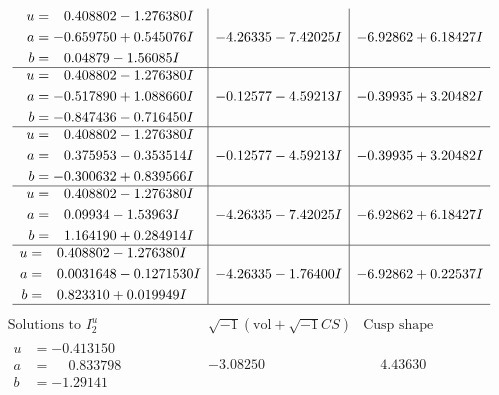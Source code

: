 \documentclass[1p]{elsarticle_modified}
\theoremstyle{definition}
\newcommand{\I}{\sqrt{-1}}
\begin{document}
$$\begin{array}{c|c|c}
\begin{aligned}
u &= \phantom{-}0.408802 - 1.276380 I \\
a &= -0.659750 + 0.545076 I \\
b &= \phantom{-}0.04879 - 1.56085 I\end{aligned}
 & -4.26335 - 7.42025 I & -6.92862 + 6.18427 I \\ \hline\begin{aligned}
u &= \phantom{-}0.408802 - 1.276380 I \\
a &= -0.517890 + 1.088660 I \\
b &= -0.847436 - 0.716450 I\end{aligned}
 & -0.12577 - 4.59213 I & -0.39935 + 3.20482 I \\ \hline\begin{aligned}
u &= \phantom{-}0.408802 - 1.276380 I \\
a &= \phantom{-}0.375953 - 0.353514 I \\
b &= -0.300632 + 0.839566 I\end{aligned}
 & -0.12577 - 4.59213 I & -0.39935 + 3.20482 I \\ \hline\begin{aligned}
u &= \phantom{-}0.408802 - 1.276380 I \\
a &= \phantom{-}0.09934 - 1.53963 I \\
b &= \phantom{-}1.164190 + 0.284914 I\end{aligned}
 & -4.26335 - 7.42025 I & -6.92862 + 6.18427 I \\ \hline\begin{aligned}
u &= \phantom{-}0.408802 - 1.276380 I \\
a &= \phantom{-}0.0031648 - 0.1271530 I \\
b &= \phantom{-}0.823310 + 0.019949 I\end{aligned}
 & -4.26335 - 1.76400 I & -6.92862 + 0.22537 I\\
 \hline 
 \end{array}$$\newpage$$\begin{array}{c|c|c}  
\text{Solutions to }I^u_{2}& \I (\text{vol} + \sqrt{-1}CS) & \text{Cusp shape}\\
 \hline 
\begin{aligned}
u &= -0.413150\phantom{ +0.000000I} \\
a &= \phantom{-}0.833798\phantom{ +0.000000I} \\
b &= -1.29141\phantom{ +0.000000I}\end{aligned}
 & -3.08250\phantom{ +0.000000I} & \phantom{-}4.43630\phantom{ +0.000000I} \\ \hline\begin{aligned}

\end{aligned}
\end{array}$$
\end{document}
